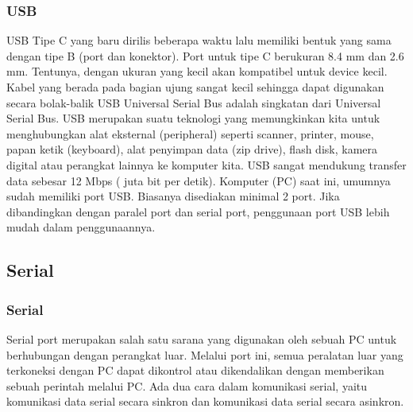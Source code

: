\subsubsection{USB}
USB Tipe C yang baru dirilis beberapa waktu lalu memiliki bentuk yang sama dengan tipe B (port dan konektor). Port untuk tipe C berukuran 8.4 mm dan 2.6 mm. Tentunya, dengan ukuran yang kecil akan kompatibel untuk device kecil. Kabel yang berada pada bagian ujung sangat kecil sehingga dapat digunakan secara bolak-balik
USB Universal Serial Bus adalah singkatan dari Universal Serial Bus. USB merupakan suatu teknologi yang memungkinkan kita untuk menghubungkan alat eksternal (peripheral) seperti scanner, printer, mouse, papan ketik (keyboard), alat penyimpan data (zip drive), flash disk, kamera digital atau perangkat lainnya ke komputer kita. USB sangat mendukung transfer data sebesar 12 Mbps ( juta bit per detik). Komputer (PC) saat ini, umumnya sudah memiliki port USB. Biasanya disediakan minimal 2 port. Jika dibandingkan dengan paralel port dan serial port, penggunaan port USB lebih mudah dalam penggunaannya.

\subsection{Serial}
\subsubsection{Serial}
Serial port merupakan salah satu sarana yang digunakan oleh sebuah PC untuk berhubungan dengan perangkat luar. Melalui port ini, semua peralatan luar yang terkoneksi dengan PC dapat dikontrol atau dikendalikan dengan memberikan sebuah perintah melalui PC. Ada dua cara dalam komunikasi serial, yaitu komunikasi data serial secara sinkron dan komunikasi data serial secara asinkron. 